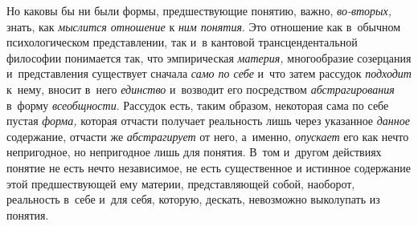 Но каковы бы ни были формы, предшествующие понятию, важно,
{\em во-вторых,} знать, как {\em мыслится отношение} к {\em ним понятия}.
Это отношение как в~обычном психологическом представлении,
так и~в кантовой трансцендентальной философии понимается так, что
эмпирическая {\em материя,}
многообразие созерцания и~представления существует сначала
{\em само по себе} и~что затем рассудок {\em подходит} к~нему, вносит в~него
{\em единство} и~возводит его посредством {\em абстрагирования} в~форму
{\em всеобщности}. Рассудок есть, таким образом, некоторая сама
по себе пустая {\em форма,}
которая отчасти получает реальность лишь через указанное
{\em данное} содержание, отчасти же {\em абстрагирует}
от него, а~именно, {\em опускает} его как
нечто непригодное, но непригодное лишь для понятия. В~том и~другом
действиях понятие не есть нечто независимое, не есть существенное и
истинное содержание этой предшествующей ему материи, представляющей собой,
наоборот, реальность в~себе и~для себя, которую, дескать, невозможно
выколупать из понятия.

